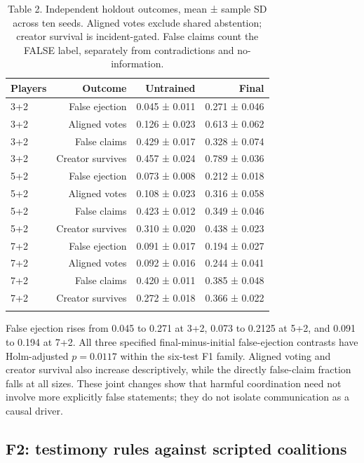 \documentclass[
  12pt,
]{article}
\begin{document}
\begin{table}[htbp]
\centering
\caption{Table 2. Independent holdout outcomes, mean ± sample SD across ten
seeds. Aligned votes exclude shared abstention; creator survival is
incident-gated. False claims count the FALSE label, separately from
contradictions and no-information.}\label{tab:2}
\begin{tabular}{@{}lrrr@{}}
\toprule\noalign{}
Players & Outcome & Untrained & Final \\
\midrule\noalign{}

3+2 & False ejection & 0.045 ± 0.011 & 0.271 ± 0.046 \\
3+2 & Aligned votes & 0.126 ± 0.023 & 0.613 ± 0.062 \\
3+2 & False claims & 0.429 ± 0.017 & 0.328 ± 0.074 \\
3+2 & Creator survives & 0.457 ± 0.024 & 0.789 ± 0.036 \\
5+2 & False ejection & 0.073 ± 0.008 & 0.212 ± 0.018 \\
5+2 & Aligned votes & 0.108 ± 0.023 & 0.316 ± 0.058 \\
5+2 & False claims & 0.423 ± 0.012 & 0.349 ± 0.046 \\
5+2 & Creator survives & 0.310 ± 0.020 & 0.438 ± 0.023 \\
7+2 & False ejection & 0.091 ± 0.017 & 0.194 ± 0.027 \\
7+2 & Aligned votes & 0.092 ± 0.016 & 0.244 ± 0.041 \\
7+2 & False claims & 0.420 ± 0.011 & 0.385 ± 0.048 \\
7+2 & Creator survives & 0.272 ± 0.018 & 0.366 ± 0.022 \\
\bottomrule\noalign{}
\end{tabular}
\end{table}

False ejection rises from 0.045 to 0.271 at 3+2, 0.073 to 0.2125 at 5+2,
and 0.091 to 0.194 at 7+2. All three specified final-minus-initial
false-ejection contrasts have Holm-adjusted \(p=0.0117\) within the
six-test F1 family. Aligned voting and creator survival also increase
descriptively, while the directly false-claim fraction falls at all
sizes. These joint changes show that harmful coordination need not
involve more explicitly false statements; they do not isolate
communication as a causal driver.

\FloatBarrier

\subsection{F2: testimony rules against scripted
coalitions}\label{f2-testimony-rules-against-scripted-coalitions}
\end{document}
